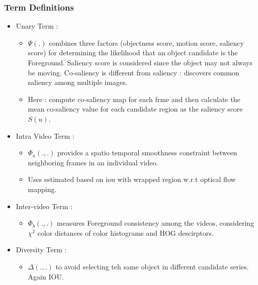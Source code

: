 \documentclass{article}
\begin{document}
\subsubsection{Term Definitions}
\begin{itemize}
\item Unary Term :
  \begin{itemize}
  \item $\Psi(.)$ combines three factors (objectness score, motion score, saliency score) for determining the likelihood that an object candidate is the Foreground. Saliency score is considered since the object may not always be moving. Co-saliency is different from saliency : discovers common saliency among multiple images.
  \item Here : compute co-saliency map for each frme and then calculate the mean co-saliency value for each candidate region as the saliency score $S(u)$.
  \end{itemize}
\item Intra Video Term :
  \begin{itemize}
  \item $\Phi_a(., .)$ provides a spatio temporal smoothness constraint between neighboring frames in an individual video.
  \item Uses estimated based on iou with wrapped region w.r.t optical flow mapping.
  \end{itemize}
\item Inter-video Term :
  \begin{itemize}
  \item $\Phi_b(.,.)$ measures Foreground consistency among the videos, considering $\chi^2$ color distances of color histograms and HOG descirptors.
  \end{itemize}
\item Diversity Term :
  \begin{itemize}
  \item $\Delta(.,.)$ to avoid selecting teh same object in different candidate series. Again IOU.
  \end{itemize}
\end{itemize}
\end{document}
